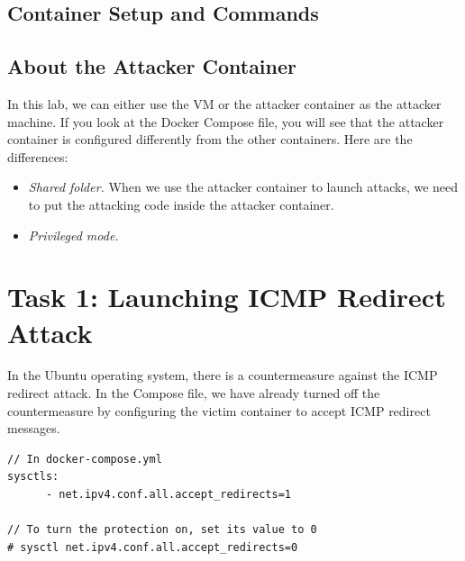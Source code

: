 \subsection{Container Setup and Commands}




\subsection{About the Attacker Container}

In this lab, we can either use the VM or the attacker container
as the attacker machine. If you look at the Docker Compose file, you will
see that the attacker container is configured differently from the other
containers. Here are the differences:

\begin{itemize}
\item \textit{Shared folder.} When we use the attacker container
to launch attacks, we need to put the attacking code inside
the attacker container.


\item \textit{Privileged mode.}


\end{itemize}


\section{Task 1: Launching ICMP Redirect Attack}

In the Ubuntu operating system, 
there is a countermeasure against the ICMP redirect attack. In the 
Compose file, we have already 
turned off the countermeasure by configuring the victim container
to accept ICMP redirect messages. 

\begin{lstlisting}
// In docker-compose.yml
sysctls:
      - net.ipv4.conf.all.accept_redirects=1

// To turn the protection on, set its value to 0
# sysctl net.ipv4.conf.all.accept_redirects=0
\end{lstlisting}


